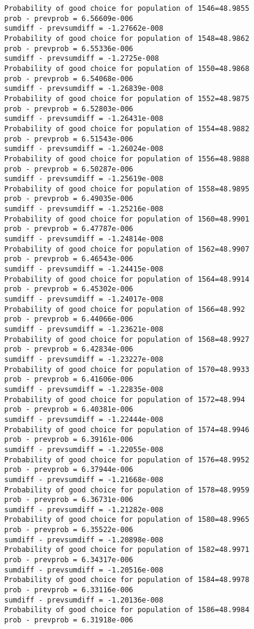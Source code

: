 \documentclass[11pt,onecolumn]{article}
\begin{document}
\begin{verbatim}
Probability of good choice for population of 1546=48.9855
prob - prevprob = 6.56609e-006
sumdiff - prevsumdiff = -1.27662e-008
Probability of good choice for population of 1548=48.9862
prob - prevprob = 6.55336e-006
sumdiff - prevsumdiff = -1.2725e-008
Probability of good choice for population of 1550=48.9868
prob - prevprob = 6.54068e-006
sumdiff - prevsumdiff = -1.26839e-008
Probability of good choice for population of 1552=48.9875
prob - prevprob = 6.52803e-006
sumdiff - prevsumdiff = -1.26431e-008
Probability of good choice for population of 1554=48.9882
prob - prevprob = 6.51543e-006
sumdiff - prevsumdiff = -1.26024e-008
Probability of good choice for population of 1556=48.9888
prob - prevprob = 6.50287e-006
sumdiff - prevsumdiff = -1.25619e-008
Probability of good choice for population of 1558=48.9895
prob - prevprob = 6.49035e-006
sumdiff - prevsumdiff = -1.25216e-008
Probability of good choice for population of 1560=48.9901
prob - prevprob = 6.47787e-006
sumdiff - prevsumdiff = -1.24814e-008
Probability of good choice for population of 1562=48.9907
prob - prevprob = 6.46543e-006
sumdiff - prevsumdiff = -1.24415e-008
Probability of good choice for population of 1564=48.9914
prob - prevprob = 6.45302e-006
sumdiff - prevsumdiff = -1.24017e-008
Probability of good choice for population of 1566=48.992
prob - prevprob = 6.44066e-006
sumdiff - prevsumdiff = -1.23621e-008
Probability of good choice for population of 1568=48.9927
prob - prevprob = 6.42834e-006
sumdiff - prevsumdiff = -1.23227e-008
Probability of good choice for population of 1570=48.9933
prob - prevprob = 6.41606e-006
sumdiff - prevsumdiff = -1.22835e-008
Probability of good choice for population of 1572=48.994
prob - prevprob = 6.40381e-006
sumdiff - prevsumdiff = -1.22444e-008
Probability of good choice for population of 1574=48.9946
prob - prevprob = 6.39161e-006
sumdiff - prevsumdiff = -1.22055e-008
Probability of good choice for population of 1576=48.9952
prob - prevprob = 6.37944e-006
sumdiff - prevsumdiff = -1.21668e-008
Probability of good choice for population of 1578=48.9959
prob - prevprob = 6.36731e-006
sumdiff - prevsumdiff = -1.21282e-008
Probability of good choice for population of 1580=48.9965
prob - prevprob = 6.35522e-006
sumdiff - prevsumdiff = -1.20898e-008
Probability of good choice for population of 1582=48.9971
prob - prevprob = 6.34317e-006
sumdiff - prevsumdiff = -1.20516e-008
Probability of good choice for population of 1584=48.9978
prob - prevprob = 6.33116e-006
sumdiff - prevsumdiff = -1.20136e-008
Probability of good choice for population of 1586=48.9984
prob - prevprob = 6.31918e-006

\end{verbatim}
\end{document}
